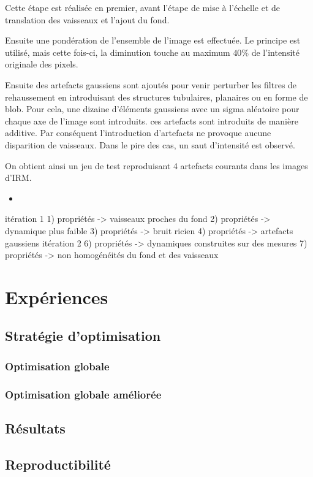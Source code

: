 Cette étape est réalisée en premier, avant l'étape de mise à l'échelle et de translation des vaisseaux et l'ajout du fond.

Ensuite une pondération de l'ensemble de l'image est effectuée. Le principe est utilisé, mais cette fois-ci, la diminution touche au maximum $40\%$ de l'intensité originale des pixels.

Ensuite des artefacts gaussiens sont ajoutés pour venir perturber les filtres de rehaussement en introduisant des structures tubulaires, planaires ou en forme de blob. Pour cela, une dizaine d'éléments gaussiens avec un sigma aléatoire pour chaque axe de l'image sont introduits. ces artefacts sont introduits de manière additive. Par conséquent l'introduction d'artefacts ne provoque aucune disparition de vaisseaux. Dans le pire des cas, un saut d'intensité est observé.



On obtient ainsi un jeu de test reproduisant 4 artefacts courants dans les images d'IRM.



\begin{itemize}
\item 
\end{itemize}

itération 1
1) propriétés -> vaisseaux proches du fond
2) propriétés -> dynamique plus faible
3) propriétés -> bruit ricien
4) propriétés -> artefacts gaussiens
itération 2
6) propriétés -> dynamiques construites sur des mesures
7) propriétés -> non homogénéités du fond et des vaisseaux


\section{Expériences}
\label{sec:Benchmark:experiences}

\subsection{Stratégie d'optimisation}
\label{sec:Benchmark:optimisation}

\subsubsection{Optimisation globale}
\label{sec:Benchmark:optimisation_globale}

\subsubsection{Optimisation globale améliorée}
\label{sec:Benchmark:optimisation_globale_ameliorée}

\subsection{Résultats}
\label{sec:Benchmark:résultats}

\subsection{Reproductibilité}
\label{sec:Benchmark:reproductibilité}
